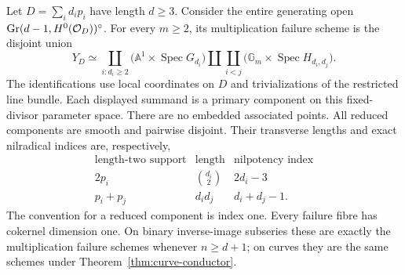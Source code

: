 \begin{theorem}
\label{thm:contact-hyperplane-primary}
Let $D=\sum_i d_i p_i$ have length $d\ge3$. Consider the entire
generating open $\operatorname{Gr}(d-1,H^0(\mathcal O_D))^\circ$.
For every $m\ge2$, its multiplication failure scheme is the disjoint
union
\begin{equation}\label{eq:hyperplane-primary-disjoint}
 Y_D\simeq
 \coprod_{i:d_i\ge2}\bigl(\mathbb A^1\times\operatorname{Spec}G_{d_i}\bigr)
 \amalg\coprod_{i<j}\bigl(\mathbb G_m\times\operatorname{Spec}H_{d_i,d_j}\bigr).
\end{equation}
The identifications use local coordinates on $D$ and trivializations
of the restricted line bundle. Each displayed summand is a primary
component on this fixed-divisor parameter space. There are no
embedded associated points. All reduced components are smooth and
pairwise disjoint. Their transverse lengths and exact nilradical
indices are, respectively,
\[
 \begin{array}{c|c|c}
 \text{length-two support}&\text{length}&\text{nilpotency index}\\ \hline
 2p_i&\binom{d_i}{2}&2d_i-3\\
 p_i+p_j&d_i d_j&d_i+d_j-1.
 \end{array}
\]
The convention for a reduced component is index one. Every failure
fibre has cokernel dimension one. On binary inverse-image subseries
these are exactly the multiplication failure schemes whenever
$n\ge d+1$; on curves they are the same schemes under
Theorem~\ref{thm:curve-conductor}.
\end{theorem}

